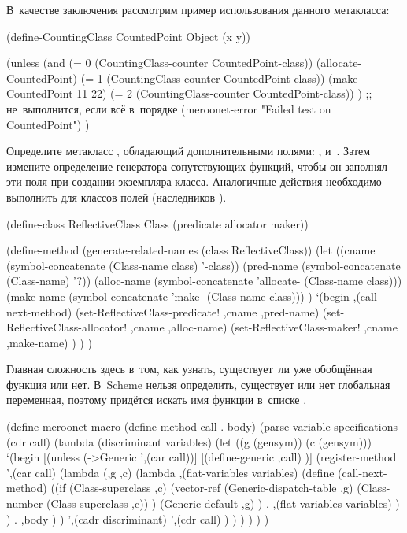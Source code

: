 В~качестве заключения рассмотрим пример использования данного метакласса:

\begin{code:lisp}
(define-CountingClass CountedPoint Object (x y))

(unless (and (= 0 (CountingClass-counter CountedPoint-class))
             (allocate-CountedPoint)
             (= 1 (CountingClass-counter CountedPoint-class))
             (make-CountedPoint 11 22)
             (= 2 (CountingClass-counter CountedPoint-class)) )
  ;; не~выполнится, если всё в~порядке
  (meroonet-error "Failed test on CountedPoint") )
\end{code:lisp}



Определите метакласс , обладающий дополнительными полями:
,  и~. Затем измените определение
генератора сопутствующих функций, чтобы он заполнял эти поля при создании
экземпляра класса. Аналогичные действия необходимо выполнить для классов полей
(наследников ).

\begin{code:lisp}
(define-class ReflectiveClass Class (predicate allocator maker))

(define-method (generate-related-names (class ReflectiveClass))
  (let ((cname      (symbol-concatenate (Class-name class) '-class))
        (pred-name  (symbol-concatenate (Class-name) '?))
        (alloc-name (symbol-concatenate 'allocate- (Class-name class)))
        (make-name  (symbol-concatenate 'make- (Class-name class))) )
    `(begin ,(call-next-method)
            (set-ReflectiveClass-predicate! ,cname ,pred-name)
            (set-ReflectiveClass-allocator! ,cname ,alloc-name)
            (set-ReflectiveClass-maker!     ,cname ,make-name) ) ) )
\end{code:lisp}



Главная сложность здесь в~том, как узнать, существует~ли уже обобщённая
функция или нет. В~Scheme нельзя определить, существует или нет глобальная
переменная, поэтому придётся искать имя функции в~списке .

\begin{code:lisp}
(define-meroonet-macro (define-method call . body)
  (parse-variable-specifications
   (cdr call)
   (lambda (discriminant variables)
     (let ((g (gensym)) (c (gensym)))
       `(begin
          [(unless (->Generic ',(car call))]
            [(define-generic ,call) )]
          (register-method
           ',(car call)
           (lambda (,g ,c)
             (lambda ,(flat-variables variables)
               (define (call-next-method)
                 ((if (Class-superclass ,c)
                      (vector-ref (Generic-dispatch-table ,g)
                                  (Class-number (Class-superclass ,c)) )
                      (Generic-default ,g) )
                  . ,(flat-variables variables) ) )
               . ,body ) )
           ',(cadr discriminant)
           ',(cdr call) ) ) ) ) ) )
\end{code:lisp}


